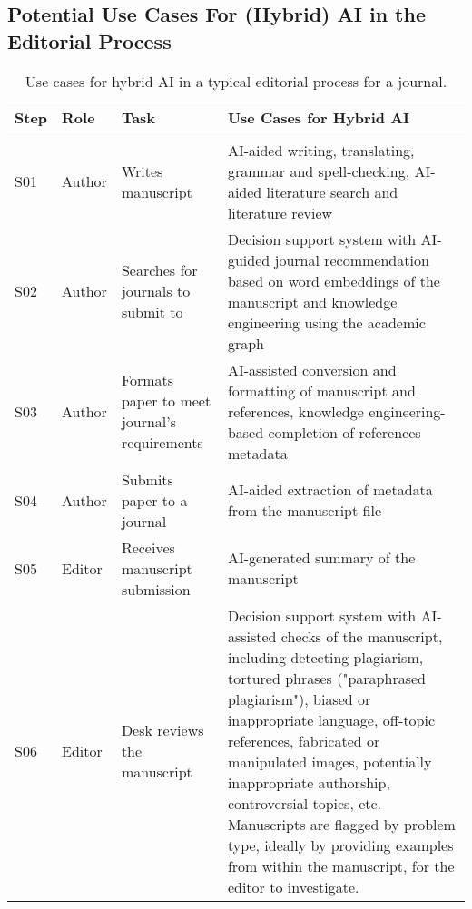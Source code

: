 \begin{landscape}
    \subsection{Potential Use Cases For (Hybrid) AI in the Editorial Process}

    \begin{table}[h!]
        \label{tab:editorialprocess}
        \caption{Use cases for hybrid AI in a typical editorial process for a journal.}
        \renewcommand{\arraystretch}{1.25}
        \small\centering
        \setlength\tabcolsep{6pt}
        \begin{tabularx}{\linewidth}{l l l X}
            \toprule
            \textbf{Step} & \textbf{Role} & \textbf{Task} & \textbf{Use Cases for Hybrid AI} \\
            \hline \\

            S01 & Author & Writes manuscript & AI-aided writing, translating, grammar and spell-checking, AI-aided literature
                search and literature review \\
            S02 & Author & Searches for journals to submit to & Decision support system with AI-guided journal recommendation
                based on word embeddings of the manuscript and knowledge engineering using the academic graph\\
            S03 & Author & Formats paper to meet journal's requirements & AI-assisted conversion and formatting of manuscript
                and references, knowledge engineering-based completion of references metadata \\
            S04 & Author & Submits paper to a journal & AI-aided extraction of metadata from the manuscript file \\
            S05 & Editor & Receives manuscript submission & AI-generated summary of the manuscript \\
            S06 & Editor & Desk reviews the manuscript & Decision support system with AI-assisted checks of the manuscript,
                including detecting plagiarism, tortured phrases ("paraphrased plagiarism"), biased or inappropriate language,
                off-topic references, fabricated or manipulated images, potentially inappropriate authorship, controversial
                topics, etc. Manuscripts are flagged by problem type, ideally by providing examples from within the manuscript,
                for the editor to investigate.\\
            \bottomrule
        \end{tabularx}
    \end{table}
\end{landscape}


